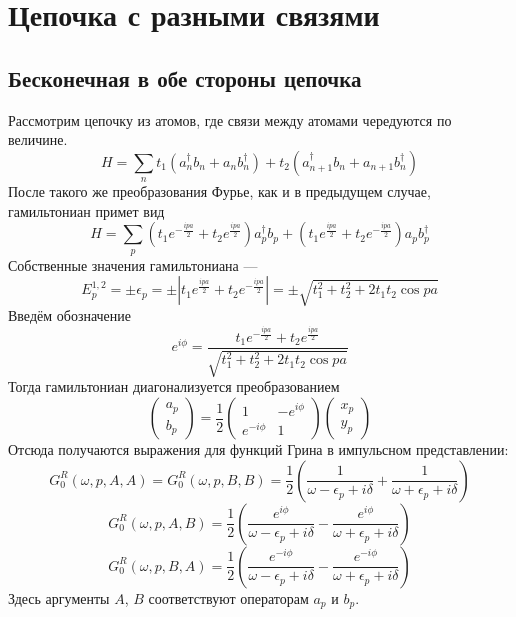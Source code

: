 \section{Цепочка с разными связями}
\subsection{Бесконечная в обе стороны цепочка}
Рассмотрим цепочку из атомов, где связи между атомами чередуются по величине.
\begin{equation}
	H = \sum_n t_1(a_n^\dagger b_n + a_n b_n^\dagger) + 
		t_2 (a_{n+1}^\dagger b_n + a_{n+1} b_n^\dagger)
\end{equation}
После такого же преобразования Фурье, как и в предыдущем случае, гамильтониан примет вид
\begin{equation}
	H = \sum_p 
			(t_1 e^{-\frac{ipa}{2}} + t_2 e^{\frac{ipa}{2}}) a_p^\dagger b_p + 
			(t_1 e^{\frac{ipa}{2}} + t_2 e^{-\frac{ipa}{2}}) a_p b_p^\dagger
\end{equation}
Собственные значения гамильтониана ---
\begin{equation}
	E_p^{1,2} = \pm \epsilon_p = \pm|t_1 e^{\frac{ipa}{2}} + t_2 e^{-\frac{ipa}{2}}| = 
		\pm\sqrt{t_1^2 + t_2^2 + 2t_1t_2 \cos{pa}}
\end{equation}
Введём обозначение 
\begin{equation}
	e^{i\phi} = \frac{t_1 e^{-\frac{ipa}{2}} + t_2 e^{\frac{ipa}{2}}}
				{\sqrt{t_1^2 + t_2^2 + 2t_1t_2 \cos{pa}}}
\end{equation}
Тогда гамильтониан диагонализуется преобразованием
\begin{equation}
	\left(
	\begin{matrix}
		a_p \\
		b_p
	\end{matrix}
	\right)
	=
	\frac12
	\left(
	\begin{matrix}
		1 & -e^{i\phi}	\\
		e^{-i\phi} & 1
	\end{matrix}
	\right)
	\left(
	\begin{matrix}
		x_p \\
		y_p
	\end{matrix}
	\right)
\end{equation}
Отсюда получаются выражения для функций Грина в импульсном представлении:
\begin{equation}
	\label{gaa}
	G^R_0 (\omega, p, A, A) =  G^R_0 (\omega, p, B, B) = \frac{1}{2}\left(
		\frac{1}{\omega - \epsilon_p + i\delta} + 
					\frac{1}{\omega + \epsilon_p + i\delta}\right)
\end{equation}
\begin{equation}
	G^R_0 (\omega, p, A, B) = \frac12 \left(\frac{e^{i\phi}}{\omega - \epsilon_p + i\delta} -
						\frac{e^{i\phi}}{\omega + \epsilon_p + i\delta} \right)
\end{equation}
\begin{equation}
	G^R_0 (\omega, p, B, A) = \frac12 \left(\frac{e^{-i\phi}}{\omega - \epsilon_p + i\delta} -
						\frac{e^{-i\phi}}{\omega + \epsilon_p + i\delta} \right)
\end{equation}
Здесь аргументы $A$, $B$ соответствуют операторам $a_p$ и $b_p$. 
